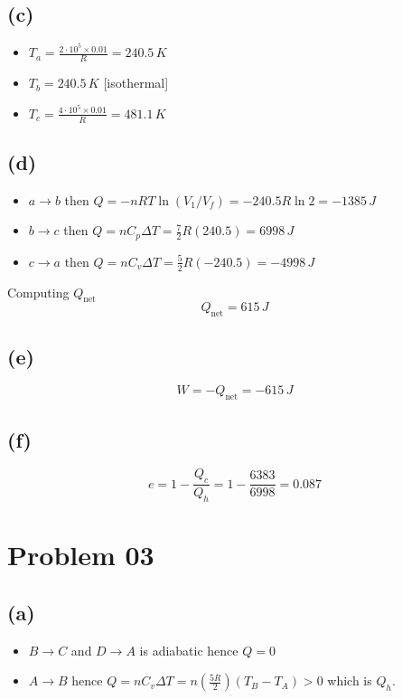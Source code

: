 \documentclass[letter]{article}
\begin{document}
\subsection*{(c)} 
\begin{itemize}
	\item $T_a = \frac{2 \cdot 10^{5} \times 0.01}{R} = 240.5 \, K$
	\item $T_b = 240.5 \, K$ [isothermal] 
	\item $T_c = \frac{4 \cdot  10^{5} \times 0.01}{R} = 481.1 \, K$
\end{itemize}


\subsection*{(d)} 
\begin{itemize}
	\item $a\to b$ then $Q = - nRT \ln( V_1 / V_f) = - 240.5 R \ln 2 = - 1385 \, J $
	\item $b\to c$ then $Q = n C_p \Delta T = \frac{7}{2} R (240.5) = 6998 \, J$ 
	\item $c \to a$ then $Q = n C_v \Delta T = \frac{5}{2} R (- 240.5) = - 4998 \, J$
\end{itemize}
Computing $Q_\text{net}$ 
\[
Q_\text{net} = 615 \, J
\] 

\subsection*{(e)} 
\[
W = - Q_\text{net} = -  615 \, J
\]

\subsection*{(f)} 
\[
e = 1 - \frac{Q_c}{Q_h} = 1 - \frac{6383}{6998} = 0.087
\] 


\section*{Problem 03} 
\subsection*{(a)} 
\begin{itemize}
	\item $B \to C$ and $D \to A$ is adiabatic hence $Q = 0$ 
	\item $A \to  B$ hence $Q = n C_v \Delta T = n \left(\frac{5R}{2}\right) (T_B - T_A) > 0$ which is $Q_h$. 
\end{itemize}
\end{document}

